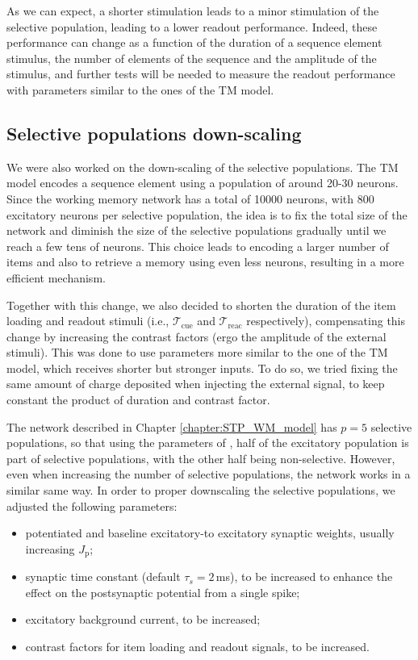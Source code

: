 \documentclass[a4paper, 12pt, twoside, openright]{book}
\begin{document}
As we can expect, a shorter stimulation leads to a minor stimulation of the selective population, leading to a lower readout performance. Indeed, these performance can change as a function of the duration of a sequence element stimulus, the number of elements of the sequence and the amplitude of the stimulus, and further tests will be needed to measure the readout performance with parameters similar to the ones of the TM model.


\subsection{Selective populations down-scaling}
We were also worked on the down-scaling of the selective populations. The TM model encodes a sequence element using a population of around 20-30 neurons. Since the working memory network has a total of 10000 neurons, with 800 excitatory neurons per selective population, the idea is to fix the total size of the network and diminish the size of the selective populations gradually until we reach a few tens of neurons. This choice leads to encoding a larger number of items and also to retrieve a memory using even less neurons, resulting in a more efficient mechanism.


Together with this change, we also decided to shorten the duration of the item loading and readout stimuli (i.e., $\mathcal{T}_{\text{cue}}$ and $\mathcal{T}_{\text{reac}}$ respectively), compensating this change by increasing the contrast factors (ergo the amplitude of the external stimuli). This was done to use parameters more similar to the one of the TM model, which receives shorter but stronger inputs. To do so, we tried fixing the same amount of charge deposited when injecting the external signal, to keep constant the product of duration and contrast factor.


The network described in Chapter \ref{chapter:STP_WM_model} has $p=5$ selective populations, so that using the parameters of \cite{Tiddia2022_WM}, half of the excitatory population is part of selective populations, with the other half being non-selective. However, even when increasing the number of selective populations, the network works in a similar same way. In order to proper downscaling the selective populations, we adjusted the following parameters:

\begin{itemize}
    \item potentiated and baseline excitatory-to excitatory synaptic weights, usually increasing $J_{\text{p}}$;
    \item synaptic time constant (default $\tau_s=2$\,ms), to be increased to enhance the effect on the postsynaptic potential from a single spike;
    \item excitatory background current, to be increased;
    \item contrast factors for item loading and readout signals, to be increased.
\end{itemize}
\end{document}
